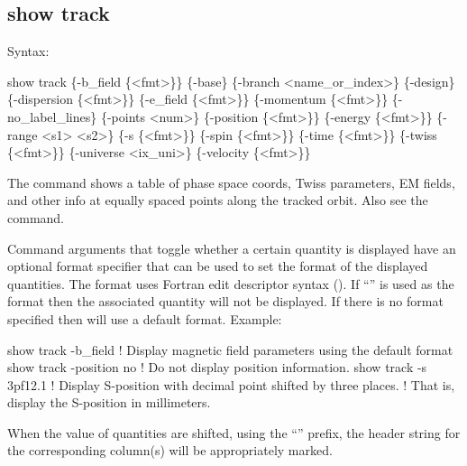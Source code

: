 {{{{{{{{{{%

\subsection{show track}
\label{s:show.track}

Syntax:
\begin{example}
  show track \{-b_field \{<fmt>\}\} \{-base\} \{-branch <name_or_index>\} \{-design\} 
      \{-dispersion \{<fmt>\}\} \{-e_field \{<fmt>\}\} \{-momentum \{<fmt>\}\} \{-no_label_lines\} 
      \{-points <num>\} \{-position \{<fmt>\}\} \{-energy \{<fmt>\}\} \{-range <s1> <s2>\}
      \{-s \{<fmt>\}\} \{-spin \{<fmt>\}\} \{-time \{<fmt>\}\} \{-twiss \{<fmt>\}\}
      \{-universe <ix_uni>\} \{-velocity \{<fmt>\}\}
\end{example}

The  command shows a table of phase space coords, Twiss parameters, EM fields, and
other info at equally spaced points along the tracked orbit. Also see the 
command.

Command arguments that toggle whether a certain quantity is displayed have an optional 
format specifier that can be used to set the format of the displayed quantities. The format uses
Fortran edit descriptor syntax (). If ``'' is used as the format then
the associated quantity will not be displayed. If there is no format specified then \tao will use
a default format. Example:
\begin{example}
  show track -b_field      ! Display magnetic field parameters using the default format
  show track -position no  ! Do not display position information.
  show track -s 3pf12.1    ! Display S-position with decimal point shifted by three places.
                           !   That is, display the S-position in millimeters.
\end{example}
When the value of quantities are shifted, using the ``'' prefix, the header string for the
corresponding column(s) will be appropriately marked.

}}}}}}}}}}
